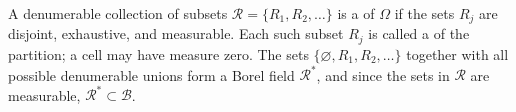 A denumerable collection of subsets $\mathcal{R} = \{R_1, R_2, \ldots\}$ is a  of $\Omega$ if the sets $R_j$ are disjoint, exhaustive, and measurable. Each such subset $R_j$ is called a  of the partition; a cell may have measure zero. The sets $\{\varnothing, R_1, R_2, \ldots\}$ together with all possible denumerable unions form a Borel field $\mathcal{R}^*$, and since the sets in $\mathcal{R}$ are measurable, $\mathcal{R}^* \subset \mathcal{B}$.
